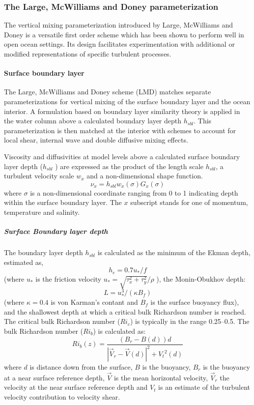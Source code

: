 \subsubsection{The Large, McWilliams and Doney parameterization}
\label{sec:origLMD}

The vertical mixing parameterization introduced by Large, McWilliams
and Doney \cite{Large94} is a versatile first order scheme which has
been shown to perform well in open ocean settings.  Its design
facilitates experimentation with additional or modified representations
of specific turbulent processes.

\paragraph{Surface boundary layer}
The Large, McWilliams and Doney scheme (LMD)
matches separate parameterizations for vertical mixing
of the surface boundary layer and the ocean interior.  A formulation
based on boundary layer similarity theory is applied in the water
column above a calculated boundary layer depth $h_{sbl}$.  This
parameterization is then matched at the interior with schemes to
account for local shear, internal wave and double diffusive mixing
effects.  

Viscosity and diffusivities at model levels above a calculated
surface boundary layer depth ($h_{sbl}$ ) are expressed as the product
of the length scale $h_{sbl}$, a turbulent velocity scale $w_x$ and a
non-dimensional shape function.
\begin{equation}
\nu_x = h_{sbl} w_x(\sigma)G_x(\sigma)
\end{equation}
where $\sigma$ is a non-dimensional coordinate ranging from 0 to 1
indicating depth within the surface boundary layer. The $x$ subscript
stands for one of momentum, temperature and salinity.

\subparagraph{Surface Boundary layer depth}
The boundary layer depth $h_{sbl}$ is calculated as the minimum of the
Ekman depth, estimated as,
\begin{equation}
h_e=0.7u_*/f
\end{equation}
(where $u_*$ is the friction velocity $u_*=\sqrt{\tau_x^2+\tau_y^2}/\rho$ ),
 the Monin-Obukhov depth:
\begin{equation}
L=u_*^3/(\kappa B_f)
\end{equation}
(where $\kappa = 0.4$ is von Karman's contant and $B_f$ is the surface
buoyancy flux), and the shallowest depth at which a critical bulk
Richardson number is reached. The critical bulk Richardson number
($Ri_c$) is typically in the range 0.25--0.5. The bulk Richardson
number ($Ri_b$) is calculated as:
\begin{equation}
Ri_b(z)=\frac{(B_r-B(d))d}{|\vec{V}_r-\vec{V}(d)|^2+{V_t}^2(d)}
\end{equation}
where $d$ is distance down from the surface, $B$ is the buoyancy,
$B_r$ is the buoyancy at a near surface reference depth, $\vec{V}$ is
the mean horizontal velocity, $\vec{V}_r$ the velocity at the near
surface reference depth and $V_t$ is an estimate of the turbulent
velocity contribution to velocity shear.

